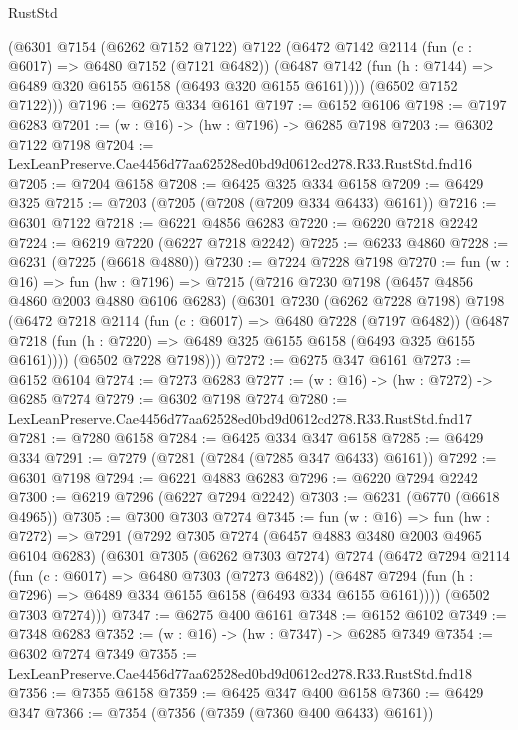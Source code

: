 \begin{lexlean}{RustStd}
\begin{coremodule}
      (@6301
        @7154
        (@6262 @7152 @7122)
        @7122
        (@6472
          @7142
          @2114
          (fun (c : @6017) => @6480 @7152 (@7121 @6482))
          (@6487 @7142 (fun (h : @7144) => @6489 @320 @6155 @6158 (@6493 @320 @6155 @6161))))
        (@6502 @7152 @7122)))
@7196 := @6275 @334 @6161
@7197 := @6152 @6106
@7198 := @7197 @6283
@7201 := (w : @16) -> (hw : @7196) -> @6285 @7198
@7203 := @6302 @7122 @7198
@7204 := LexLeanPreserve.Cae4456d77aa62528ed0bd9d0612cd278.R33.RustStd.fnd16
@7205 := @7204 @6158
@7208 := @6425 @325 @334 @6158
@7209 := @6429 @325
@7215 := @7203 (@7205 (@7208 (@7209 @334 @6433) @6161))
@7216 := @6301 @7122
@7218 := @6221 @4856 @6283
@7220 := @6220 @7218 @2242
@7224 := @6219 @7220 (@6227 @7218 @2242)
@7225 := @6233 @4860
@7228 := @6231 (@7225 (@6618 @4880))
@7230 := @7224 @7228 @7198
@7270 := fun (w : @16) =>
  fun (hw : @7196) =>
  @7215
    (@7216
      @7230
      @7198
      (@6457 @4856 @4860 @2003 @4880 @6106 @6283)
      (@6301
        @7230
        (@6262 @7228 @7198)
        @7198
        (@6472
          @7218
          @2114
          (fun (c : @6017) => @6480 @7228 (@7197 @6482))
          (@6487 @7218 (fun (h : @7220) => @6489 @325 @6155 @6158 (@6493 @325 @6155 @6161))))
        (@6502 @7228 @7198)))
@7272 := @6275 @347 @6161
@7273 := @6152 @6104
@7274 := @7273 @6283
@7277 := (w : @16) -> (hw : @7272) -> @6285 @7274
@7279 := @6302 @7198 @7274
@7280 := LexLeanPreserve.Cae4456d77aa62528ed0bd9d0612cd278.R33.RustStd.fnd17
@7281 := @7280 @6158
@7284 := @6425 @334 @347 @6158
@7285 := @6429 @334
@7291 := @7279 (@7281 (@7284 (@7285 @347 @6433) @6161))
@7292 := @6301 @7198
@7294 := @6221 @4883 @6283
@7296 := @6220 @7294 @2242
@7300 := @6219 @7296 (@6227 @7294 @2242)
@7303 := @6231 (@6770 (@6618 @4965))
@7305 := @7300 @7303 @7274
@7345 := fun (w : @16) =>
  fun (hw : @7272) =>
  @7291
    (@7292
      @7305
      @7274
      (@6457 @4883 @3480 @2003 @4965 @6104 @6283)
      (@6301
        @7305
        (@6262 @7303 @7274)
        @7274
        (@6472
          @7294
          @2114
          (fun (c : @6017) => @6480 @7303 (@7273 @6482))
          (@6487 @7294 (fun (h : @7296) => @6489 @334 @6155 @6158 (@6493 @334 @6155 @6161))))
        (@6502 @7303 @7274)))
@7347 := @6275 @400 @6161
@7348 := @6152 @6102
@7349 := @7348 @6283
@7352 := (w : @16) -> (hw : @7347) -> @6285 @7349
@7354 := @6302 @7274 @7349
@7355 := LexLeanPreserve.Cae4456d77aa62528ed0bd9d0612cd278.R33.RustStd.fnd18
@7356 := @7355 @6158
@7359 := @6425 @347 @400 @6158
@7360 := @6429 @347
@7366 := @7354 (@7356 (@7359 (@7360 @400 @6433) @6161))

\end{coremodule}
\end{lexlean}
